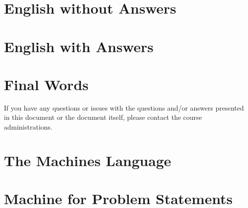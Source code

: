 \documentclass[a4paper,11pt,oneside]{book}
\begin{document}
\begin{sloppypar}

\chapter{English without Answers}
\label{englishWithoutAnswers}


\chapter{English with Answers}
\label{englishWithAnswers}










\chapter{Final Words}
\label{finalWords}
If you have any questions or issues with the questions and/or answers presented in this document or the document itself, please contact the course administrations.

\pagebreak

\appendix

\chapter{The Machines Language}
\label{machinesLanguage}


\chapter{Machine for Problem Statements}
\label{machineForProblemStatements}


\printbibliography

\end{sloppypar}
\end{document}
